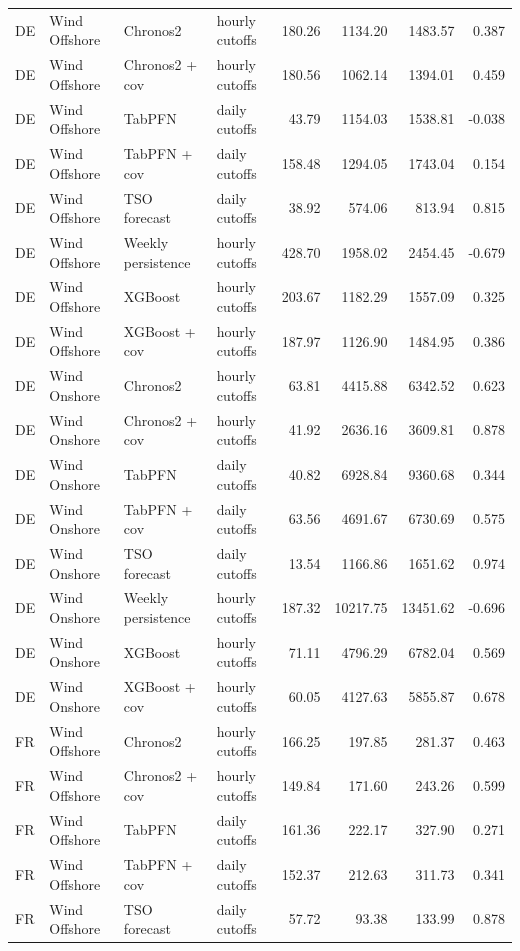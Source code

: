 \begin{longtable}{llllrrrr}
DE & Wind Offshore & Chronos2 & hourly cutoffs & 180.26 & 1134.20 & 1483.57 & 0.387 \\
DE & Wind Offshore & Chronos2 + cov & hourly cutoffs & 180.56 & 1062.14 & 1394.01 & 0.459 \\
DE & Wind Offshore & TabPFN & daily cutoffs & 43.79 & 1154.03 & 1538.81 & -0.038 \\
DE & Wind Offshore & TabPFN + cov & daily cutoffs & 158.48 & 1294.05 & 1743.04 & 0.154 \\
DE & Wind Offshore & TSO forecast & daily cutoffs & 38.92 & 574.06 & 813.94 & 0.815 \\
DE & Wind Offshore & Weekly persistence & hourly cutoffs & 428.70 & 1958.02 & 2454.45 & -0.679 \\
DE & Wind Offshore & XGBoost & hourly cutoffs & 203.67 & 1182.29 & 1557.09 & 0.325 \\
DE & Wind Offshore & XGBoost + cov & hourly cutoffs & 187.97 & 1126.90 & 1484.95 & 0.386 \\
DE & Wind Onshore & Chronos2 & hourly cutoffs & 63.81 & 4415.88 & 6342.52 & 0.623 \\
DE & Wind Onshore & Chronos2 + cov & hourly cutoffs & 41.92 & 2636.16 & 3609.81 & 0.878 \\
DE & Wind Onshore & TabPFN & daily cutoffs & 40.82 & 6928.84 & 9360.68 & 0.344 \\
DE & Wind Onshore & TabPFN + cov & daily cutoffs & 63.56 & 4691.67 & 6730.69 & 0.575 \\
DE & Wind Onshore & TSO forecast & daily cutoffs & 13.54 & 1166.86 & 1651.62 & 0.974 \\
DE & Wind Onshore & Weekly persistence & hourly cutoffs & 187.32 & 10217.75 & 13451.62 & -0.696 \\
DE & Wind Onshore & XGBoost & hourly cutoffs & 71.11 & 4796.29 & 6782.04 & 0.569 \\
DE & Wind Onshore & XGBoost + cov & hourly cutoffs & 60.05 & 4127.63 & 5855.87 & 0.678 \\
FR & Wind Offshore & Chronos2 & hourly cutoffs & 166.25 & 197.85 & 281.37 & 0.463 \\
FR & Wind Offshore & Chronos2 + cov & hourly cutoffs & 149.84 & 171.60 & 243.26 & 0.599 \\
FR & Wind Offshore & TabPFN & daily cutoffs & 161.36 & 222.17 & 327.90 & 0.271 \\
FR & Wind Offshore & TabPFN + cov & daily cutoffs & 152.37 & 212.63 & 311.73 & 0.341 \\
FR & Wind Offshore & TSO forecast & daily cutoffs & 57.72 & 93.38 & 133.99 & 0.878 \\

\end{longtable}
